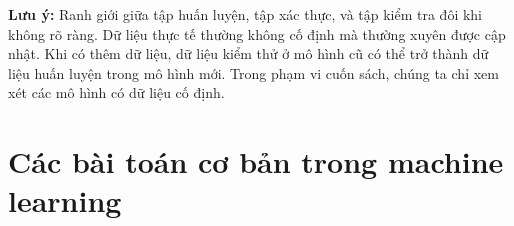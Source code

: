 \textbf{Lưu ý:} Ranh giới giữa tập huấn luyện, tập xác thực, và tập kiểm tra
đôi khi không rõ ràng. Dữ liệu thực tế thường không cố định mà thường xuyên được
cập nhật. Khi có thêm dữ liệu, dữ liệu kiểm thử ở mô hình cũ có thể trở thành dữ
liệu huấn luyện trong mô hình mới. Trong phạm vi cuốn sách, chúng ta chỉ xem xét
các mô hình có dữ liệu cố định.




\section{Các bài toán cơ bản trong machine learning}








